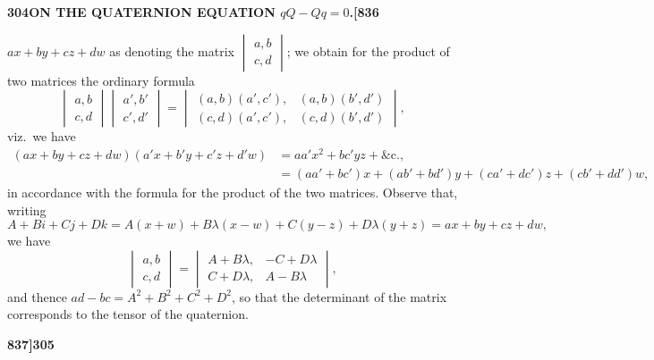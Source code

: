 \documentclass[12pt,a4paper]{article}
\theoremstyle{definition}
\begin{document}
\newpage
\setcounter{page}{304}

\noindent\textbf{304}\hfill\textbf{ON THE QUATERNION EQUATION $qQ - Qq = 0$.}\hfill\textbf{[836}

\bigskip

\noindent $ax + by + cz + dw$ as denoting the matrix $\begin{vmatrix} a, b \\ c, d \end{vmatrix}$; we obtain for the product of two matrices the ordinary formula
\[
\begin{vmatrix} a, b \\ c, d \end{vmatrix} \begin{vmatrix} a', b' \\ c', d' \end{vmatrix} = \begin{vmatrix} (a, b)(a', c'), & (a, b)(b', d') \\ (c, d)(a', c'), & (c, d)(b', d') \end{vmatrix},
\]
viz.\ we have
\begin{align*}
(ax + by + cz + dw)(a'x + b'y + c'z + d'w) &= aa'x^2 + bc'yz + \&\text{c.}, \\
&= (aa' + bc')x + (ab' + bd')y + (ca' + dc')z + (cb' + dd')w,
\end{align*}
in accordance with the formula for the product of the two matrices. Observe that, writing
\[
A + Bi + Cj + Dk = A(x + w) + B\lambda(x - w) + C(y - z) + D\lambda(y + z) = ax + by + cz + dw,
\]
we have
\[
\begin{vmatrix} a, b \\ c, d \end{vmatrix} = \begin{vmatrix} A + B\lambda, & -C + D\lambda \\ C + D\lambda, & A - B\lambda \end{vmatrix},
\]
and thence $ad - bc = A^2 + B^2 + C^2 + D^2$, so that the determinant of the matrix corresponds to the tensor of the quaternion.

\vspace{2em}


\newpage
\setcounter{page}{305}

\noindent\textbf{837]}\hfill\textbf{305}
\end{document}
